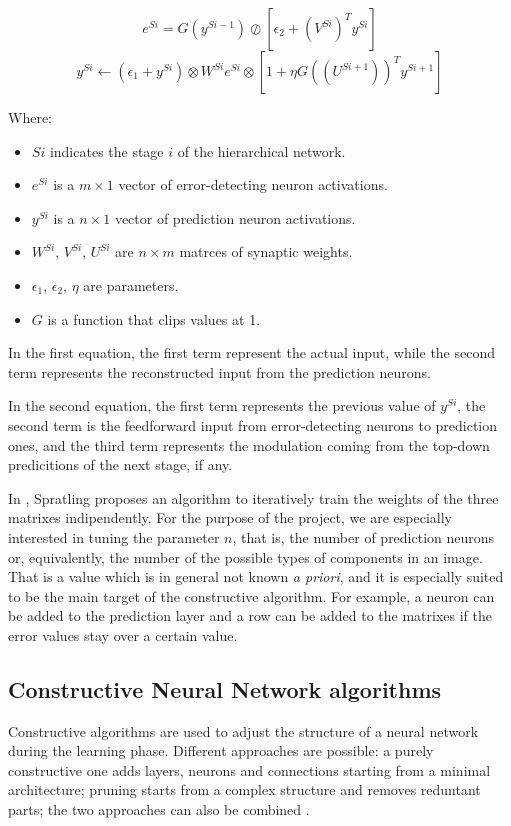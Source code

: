 \documentclass[a4paper,12pt]{article}
\begin{document}
		$$e^{Si} = G(y^{Si-1}) \oslash [\epsilon_2 + (V^{Si})^T y^{Si}]$$
		$$y^{Si} \leftarrow (\epsilon_1 + y^{Si}) \otimes W^{Si}e^{Si} \otimes [1 + \eta G((U^{Si+1}))^T y^{Si+1}]$$
		
		Where:
		\begin{itemize}
			\item $Si$ indicates the stage $i$ of the hierarchical network.
			\item $e^{Si}$ is a $m \times 1$ vector of error-detecting neuron activations.
			\item $y^{Si}$ is a $n \times 1$ vector of prediction neuron activations.
			\item $W^{Si}$, $V^{Si}$, $U^{Si}$ are $n \times m$ matrces of synaptic weights.
			\item $\epsilon_1$, $\epsilon_2$, $\eta$ are parameters.
			\item $G$ is a function that clips values at 1. 
		\end{itemize}
		
		In the first equation, the first term represent the actual input, while the second term represents the reconstructed input from the prediction neurons.
		
		In the second equation, the first term represents the previous value of $y^{Si}$, the second term is the feedforward input from error-detecting neurons to prediction ones, and
		the third term represents the modulation coming from the top-down predicitions of the next stage, if any.
		
		In \cite{spratling2012unsupervised}, Spratling proposes an algorithm to iteratively train the weights of the three matrixes indipendently. For the purpose
		of the project, we are especially interested in tuning the parameter $n$, that is, the number of prediction neurons or, equivalently, the number of
		the possible types of components in an image. That is a value which is in general not known \emph{a priori}, and it is especially suited to be
		the main target of the constructive algorithm. For example, a neuron can be added to the prediction layer and a row can be added to the matrixes
		if the error values stay over a certain value.
		
	\subsection{Constructive Neural Network algorithms}
		Constructive algorithms are used to adjust the structure of a neural network during the learning phase.
		Different approaches are possible: a purely constructive one adds layers, neurons and connections starting from a minimal architecture; pruning
		starts from a complex structure and removes reduntant parts; the two approaches can also be combined \cite{parekh2000constructive}.
		
\end{document}
